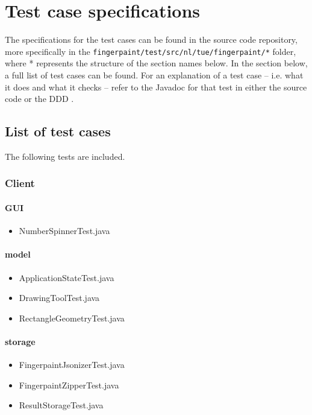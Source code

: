 \chapter{Test case specifications}\label{chap:testcasespec}

The specifications for the test cases can be found in the source code repository, more specifically in the \texttt{fingerpaint/test/src/nl/tue/fingerpaint/*} folder, where * represents the structure of the section names below. In the section below, a full list of test cases can be found. For an explanation of a test case -- i.e. what it does and what it checks -- refer to the Javadoc for that test in either the source code or the DDD \cite{DDD}.

\section{List of test cases}

The following tests are included.

\subsection{Client}
\subsubsection{GUI}
\begin{itemize}
\item NumberSpinnerTest.java
\end{itemize}
\subsubsection{model}
\begin{itemize}
\item ApplicationStateTest.java
\item DrawingToolTest.java
\item RectangleGeometryTest.java
\end{itemize}
\subsubsection{storage}
\begin{itemize}
\item FingerpaintJsonizerTest.java
\item FingerpaintZipperTest.java
\item ResultStorageTest.java
\end{itemize}
